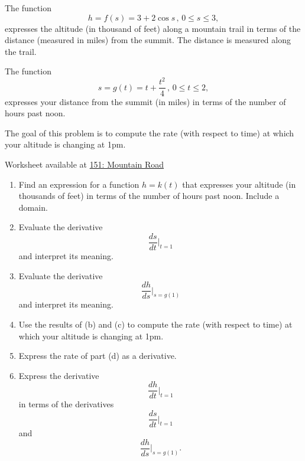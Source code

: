 \documentclass{ximera}
\begin{document}
\begin{exercise}  \label{Exe:5t5yh5jjjhbbnn}
The function
\[
    h = f(s)  = 3+2\cos s \, ,\, 0\leq s \leq 3 ,
\]
expresses the altitude (in thousand of feet) along a mountain trail in terms of the distance (measured in miles) from the summit. The distance is measured along the trail.

The function 
\[
     s = g(t) = t + \frac{t^2}{4}  \, , \, 0 \leq t \leq 2 ,
\]
expresses your distance from the summit (in miles) in terms of the number of hours past noon.

The goal of this problem is to compute the rate (with respect to time) at which your altitude is changing at 1pm.

\begin{onlineOnly}
    \begin{center}
\end{center}
\end{onlineOnly}

Worksheet available at \href{https://www.desmos.com/calculator/twfsqmmgyb}{151: Mountain Road}



\begin{enumerate}
\item Find an expression for a function $h=k(t)$ that expresses your altitude (in thousands of feet) in terms of the number of hours past noon. Include a domain.

\item Evaluate the derivative
\[
      \frac{ds}{dt}\Big|_{t=1}
\]
and interpret its meaning.

\item Evaluate the derivative
\[
      \frac{dh}{ds}\Big|_{s=g(1)}
\]
and interpret its meaning.

\item Use the results of (b) and (c) to compute the rate (with respect to time) at which your altitude is changing at 1pm.

\item Express the rate of part (d) as a derivative.

\item Express the derivative
\[
    \frac{dh}{dt}\Big|_{t=1}
\]
in terms of the derivatives 
\[
      \frac{ds}{dt}\Big|_{t=1}
\]
and 
\[
      \frac{dh}{ds}\Big|_{s=g(1)} .
\]
\end{enumerate}


\end{exercise}
\end{document}
